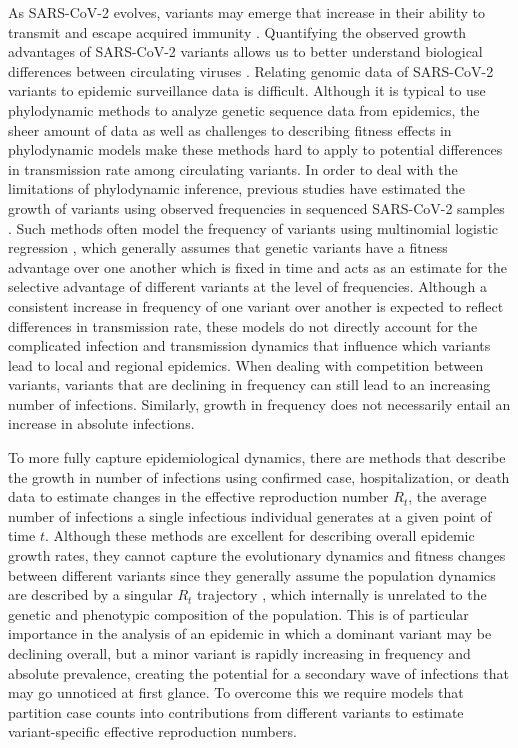 As SARS-CoV-2 evolves, variants may emerge that increase in their ability to transmit and escape acquired immunity \cite{tao2021biological}.
Quantifying the observed growth advantages of SARS-CoV-2 variants allows us to better understand biological differences between circulating viruses \cite{tegally2021detection, davies2021estimated}.
Relating genomic data of SARS-CoV-2 variants to epidemic surveillance data is difficult.
Although it is typical to use phylodynamic methods to analyze genetic sequence data from epidemics, the sheer amount of data as well as challenges to describing fitness effects in phylodynamic models make these methods hard to apply to potential differences in transmission rate among circulating variants.
In order to deal with the limitations of phylodynamic inference, previous studies have estimated the growth of variants using observed frequencies in sequenced SARS-CoV-2 samples \cite{Annavajhala2021, faria2021genomics, obermeyer2022analysis, Ito2021}.
Such methods often model the frequency of variants using multinomial logistic regression \cite{Annavajhala2021, obermeyer2022analysis}, which generally assumes that genetic variants have a fitness advantage over one another which is fixed in time and acts as an estimate for the selective advantage of different variants at the level of frequencies.
Although a consistent increase in frequency of one variant over another is expected to reflect differences in transmission rate, these models do not directly account for the complicated infection and transmission dynamics that influence which variants lead to local and regional epidemics.
When dealing with competition between variants, variants that are declining in frequency can still lead to an increasing number of infections.
Similarly, growth in frequency does not necessarily entail an increase in absolute infections.

To more fully capture epidemiological dynamics, there are methods that describe the growth in number of infections using confirmed case, hospitalization, or death data to estimate changes in the effective reproduction number $R_{t}$, the average number of infections a single infectious individual generates at a given point of time $t$.
Although these methods are excellent for describing overall epidemic growth rates, they cannot capture the evolutionary dynamics and fitness changes between different variants since they generally assume the population dynamics are described by a singular $R_{t}$ trajectory \cite{Cori2013, Abbott2020}, which internally is unrelated to the genetic and phenotypic composition of the population.
This is of particular importance in the analysis of an epidemic in which a dominant variant may be declining overall, but a minor variant is rapidly increasing in frequency and absolute prevalence, creating the potential for a secondary wave of infections that may go unnoticed at first glance.
To overcome this we require models that partition case counts into contributions from different variants to estimate variant-specific effective reproduction numbers.

